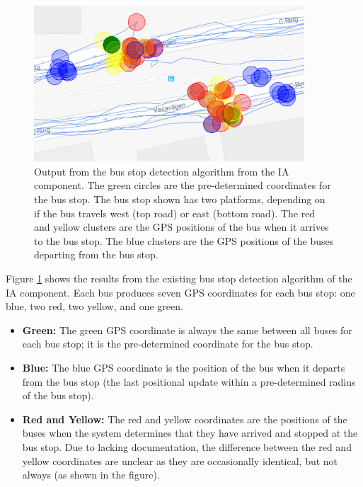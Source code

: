 \begin{figure}[ht!]
    \centering
    \includegraphics[width=0.9\textwidth]{figures/bus_stops}
    \caption[Output from the bus stop detection algorithm from the IA component]
    {\small Output from the bus stop detection algorithm from the IA component.
    The green circles are the pre-determined coordinates for the bus stop.
    The bus stop shown has two platforms, depending on if the bus travels west (top road) or east (bottom road).
    The red and yellow clusters are the GPS positions of the bus when it arrives to the bus stop.
    The blue clusters are the GPS positions of the buses departing from the bus stop.
    }
    \label{fig:bus-stop-clusters}
\end{figure}

Figure \ref{fig:bus-stop-clusters} shows the results from the existing bus stop detection algorithm of the IA component.
Each bus produces seven GPS coordinates for each bus stop: one blue, two red, two yellow, and one green.
\begin{itemize}
    \item \textbf{Green:} The green GPS coordinate is always the same between all buses for each bus stop; it is the pre-determined coordinate for the bus stop.
    \item \textbf{Blue:} The blue GPS coordinate is the position of the bus when it departs from the bus stop (the last positional update within a pre-determined radius of the bus stop).
    \item \textbf{Red and Yellow:} The red and yellow coordinates are the positions of the buses when the system determines that they have arrived and stopped at the bus stop.
    Due to lacking documentation, the difference between the red and yellow coordinates are unclear as they are occasionally identical, but not always (as shown in the figure).
\end{itemize}

